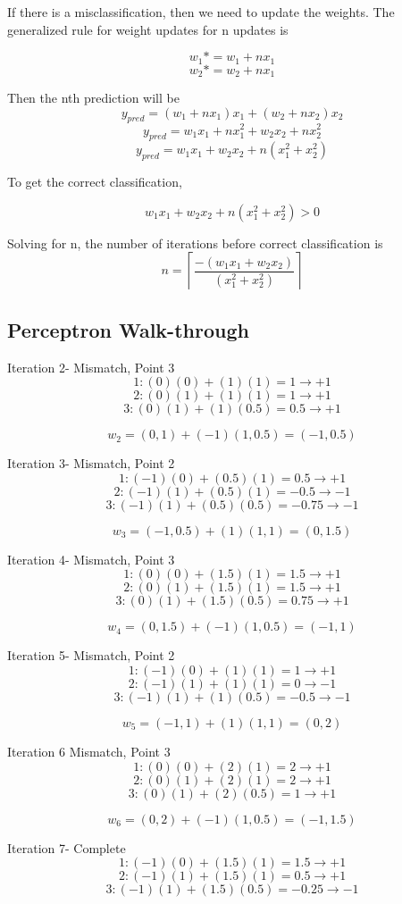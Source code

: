 \documentclass{article}
\begin{document}
If there is a misclassification, then we need to update the weights. The generalized rule for weight updates for n updates is

\[w_1* = w_1 + nx_1 \]
\[w_2* = w_2 + nx_1\]

Then the nth prediction will be
\[y_{pred} = (w_1 + nx_1)x_1 + (w_2 + nx_2)x_2\]
\[y_{pred} = w_1x_1 + nx_1^2 + w_2x_2 + nx_2^2\]
\[y_{pred} = w_1x_1 + w_2x_2 + n(x_1^2 + x_2^2)\]

To get the correct classification, 

\[w_1x_1 + w_2x_2 + n(x_1^2 + x_2^2) > 0\]

Solving for n, the number of iterations before correct classification is
\[n = \left \lceil{\frac{-(w_1x_1 + w_2x_2)}{(x_1^2 + x_2^2)}}\right \rceil \]

\subsection{Perceptron Walk-through}

Iteration 2- Mismatch, Point 3
\[1: (0)(0) + (1)(1) = 1 \rightarrow +1\]
\[2: (0)(1) + (1)(1) = 1 \rightarrow +1\]
\[3: (0)(1) + (1)(0.5) = 0.5 \rightarrow +1\]

\[w_2 = (0,1) + (-1)(1, 0.5) = (-1,0.5)\]

Iteration 3- Mismatch, Point 2
\[1: (-1)(0) + (0.5)(1) = 0.5 \rightarrow +1\]
\[2: (-1)(1) + (0.5)(1) = -0.5 \rightarrow -1\]
\[3: (-1)(1) + (0.5)(0.5) = -0.75 \rightarrow -1\]

\[w_3 = (-1,0.5) + (1)(1, 1) = (0, 1.5)\]

Iteration 4- Mismatch, Point 3
\[1: (0)(0) + (1.5)(1) = 1.5 \rightarrow +1\]
\[2: (0)(1) + (1.5)(1) = 1.5 \rightarrow +1\]
\[3: (0)(1) + (1.5)(0.5) = 0.75 \rightarrow +1\]

\[w_4 = (0, 1.5) + (-1)(1, 0.5) = (-1,1)\]

Iteration 5- Mismatch, Point 2
\[1: (-1)(0) + (1)(1) = 1 \rightarrow +1\]
\[2: (-1)(1) + (1)(1) = 0 \rightarrow -1\]
\[3: (-1)(1) + (1)(0.5) = -0.5 \rightarrow -1\]

\[w_5 = (-1,1) + (1)(1, 1) = (0,2)\]

Iteration 6 Mismatch, Point 3
\[1: (0)(0) + (2)(1) = 2 \rightarrow +1\]
\[2: (0)(1) + (2)(1) = 2 \rightarrow +1\]
\[3: (0)(1) + (2)(0.5) = 1 \rightarrow +1\]

\[w_6 = (0,2) + (-1)(1, 0.5) = (-1,1.5)\]

Iteration 7- Complete
\[1: (-1)(0) + (1.5)(1) = 1.5 \rightarrow +1\]
\[2: (-1)(1) + (1.5)(1) = 0.5 \rightarrow +1\]
\[3: (-1)(1) + (1.5)(0.5) = -0.25 \rightarrow -1\]
\end{document}

